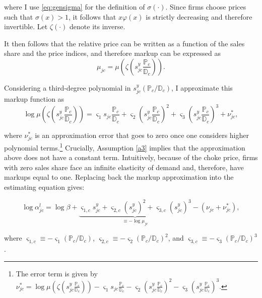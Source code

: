 where I use \eqref{eq:gensigma} for the definition of $\sigma(\cdot)$. Since firms choose prices such that $\sigma(x) > 1$, it follows that $x\varphi(x)$ is strictly decreasing and therefore invertible. Let $\zeta(\cdot)$ denote its inverse.

It then follows that the relative price can be written as a function of the sales share and the price indices, and therefore markup can be expressed as
\begin{equation*}
	\mu_{jc} = \mu\left(\zeta\left( s^y_{jc} \frac{\mathbb{P}_c}{\mathbb{D}_c}\right) \right).
\end{equation*}

Considering a third-degree polynomial in $s^y_{jc} (\mathbb{P}_c/\mathbb{D}_c)$, I approximate this markup function as
\begin{equation*}
	\log \mu\left(\zeta\left( s^y_{jc} \frac{\mathbb{P}_c}{\mathbb{D}_c}\right) \right) = \varsigma_1 s_{jc} \frac{\mathbb{P}_c}{\mathbb{D}_c} + \varsigma_2 \left(s^y_{jc} \frac{\mathbb{P}_c}{\mathbb{D}_c}\right)^2 + \varsigma_3 \left(s^y_{jc} \frac{\mathbb{P}_c}{\mathbb{D}_c}\right)^3 + \nu^*_{jc},
\end{equation*}

where $\nu^* _{jc}$ is an approximation error that goes to zero once one considers higher polynomial terms.\footnote{The error term is given by $\nu^*_{jc} = \log \mu\left(\zeta\left( s^y_{jc} \frac{\mathbb{P}_c}{\mathbb{D}_c}\right) \right) - \varsigma_1 s_{jc} \frac{\mathbb{P}_c}{\mathbb{D}_c} - \varsigma_2 \left(s^y_{jc} \frac{\mathbb{P}_c}{\mathbb{D}_c}\right)^2 - \varsigma_3 \left(s^y_{jc} \frac{\mathbb{P}_c}{\mathbb{D}_c}\right)^3$.} Crucially, Assumption \ref{a3} implies that the approximation above does not have a constant term. Intuitively, because of the choke price, firms with zero sales share face an infinite elasticity of demand and, therefore, have markups equal to one. Replacing back the markup approximation into the estimating equation gives:

\begin{equation*}
	\log \alpha_{jc}^l = \log \beta + \underbrace{\varsigma_{1,c} s^y_{jc} + \varsigma_{2,c} (s^y_{jc})^2 + \varsigma_{3,c} (s^y_{jc})^3}_{\equiv -\log \mu_{jc}} - (\nu_{jc} + \nu^*_{jc}),
\end{equation*}

where $\varsigma_{1,c} \equiv - \varsigma_1(\mathbb{P}_c/\mathbb{D}_c)$, $\varsigma_{2,c} \equiv - \varsigma_2 (\mathbb{P}_c/\mathbb{D}_c)^2$, and $\varsigma_{3,c} \equiv - \varsigma_3 (\mathbb{P}_c/\mathbb{D}_c)^3$.

